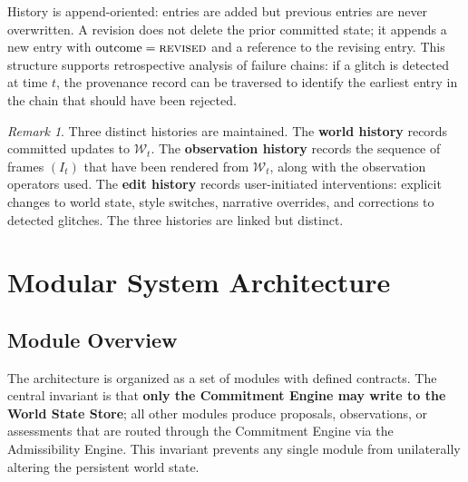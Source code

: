 \documentclass[12pt,a4paper]{article}
\theoremstyle{plain}
\theoremstyle{definition}
\theoremstyle{remark}
\newtheorem{remark}[theorem]{Remark}
\begin{document}
History is append-oriented: entries are added but previous entries are never overwritten. A revision does not delete the prior committed state; it appends a new entry with $\mathrm{outcome} = \textsc{revised}$ and a reference to the revising entry. This structure supports retrospective analysis of failure chains: if a glitch is detected at time $t$, the provenance record can be traversed to identify the earliest entry in the chain that should have been rejected.

\begin{remark}
Three distinct histories are maintained. The \textbf{world history} records committed updates to $\mathcal{W}_t$. The \textbf{observation history} records the sequence of frames $(I_t)$ that have been rendered from $\mathcal{W}_t$, along with the observation operators used. The \textbf{edit history} records user-initiated interventions: explicit changes to world state, style switches, narrative overrides, and corrections to detected glitches. The three histories are linked but distinct.
\end{remark}


\section{Modular System Architecture}
\label{sec:architecture}

\subsection{Module Overview}

The architecture is organized as a set of modules with defined contracts. The central invariant is that \textbf{only the Commitment Engine may write to the World State Store}; all other modules produce proposals, observations, or assessments that are routed through the Commitment Engine via the Admissibility Engine. This invariant prevents any single module from unilaterally altering the persistent world state.
\end{document}
